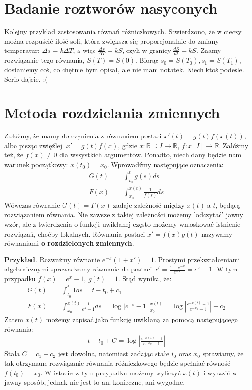 \section{Badanie roztworów nasyconych}
Kolejny przykład zastosowania równań różniczkowych. Stwierdzono, że w cieczy można rozpuścić ilość soli, która zwiększa się proporcjonalnie do zmiany temperatur: $\Delta s=k\Delta T$, a więc $\frac{\Delta s}{\Delta T}=kS$, czyli w granicy $\frac{dS}{dt}=kS$. Znamy rozwiązanie tego równania, $S\left( T \right) =S\left( 0 \right) $. Biorąc $s_0=S(T_0), s_1=S(T_1)$, dostaniemy coś, co chętnie bym opisał, ale nie mam notatek. Niech ktoś podeśle. Serio dajcie. :(

\section{Metoda rozdzielania zmiennych}
Załóżmy, że mamy do czynienia z równaniem postaci $x'(t) = g(t)f\left(x(t)\right)$, albo pisząc zwięźlej: $x' = g(t)f(x)$, gdzie $x : \mathbb{R} \supseteq I \to \mathbb{R}$, $f : x\left[I\right] \to \mathbb{R}$. Załóżmy też, że $f(x) \neq 0$ dla wszystkich argumentów. Ponadto, niech dany będzie nam warunek początkowy: $x(t_0) = x_0$. Wprowadźmy następujące oznaczenia:
\begin{align*}
	G(t) =& \int_{t_0}^{t} g(s) ds \\
	F(x) =& \int_{x_0}^{x(t)} \frac{1}{f(s)} ds
\end{align*}
Wówczas równanie $G(t) = F(x)$ zadaje zależność między $x(t)$ a $t$, będącą rozwiązaniem równania. Nie zawsze z takiej zależności możemy 'odczytać' jawny wzór, ale z twierdzenia o funkcji uwikłanej często możemy wnioskować istnienie rozwiązań, choćby lokalnych. Równania postaci $x' = f(x)g(t)$ nazywamy równaniami \textbf{o rozdzielonych zmiennych}. 

\textbf{Przykład}. Rozważmy równanie $e^{-x}(1+x')=1$. Prostymi przekształceniami algebraicznymi sprowadzamy równanie do postaci $x' = \frac{1-e^{-x}}{e^{-x}} = e^x-1$. W tym przypadku $f(x) = e^x-1$, $g(t) = 1$. Stąd wynika, że:
\begin{align*}
	G(t) =& \int_{t_0}^{t} 1 ds = t-t_0+c_1 \\
	F(x) =& \int_{x_0}^{x(t)} \frac{1}{e^s-1} ds = \log|e^{-s}-1|\bigg|_{x_0}^{x(t)} = \log \left| \frac{e^{-x(t)}-1}{e^{-x_0}-1}\right| +c_2
\end{align*}
Zatem $x(t)$ możemy zapisać jako funkcję uwikłaną za pomocą następującego równania:
\begin{align*}
	t-t_0 + C = \log\left|\frac{e^{-x(t)}-1}{e^{-x_0}-1}\right|
\end{align*}
Stała $C = c_1-c_2$ jest dowolna, natomiast zadając stałe $t_0$ oraz $x_0$ sprawiamy, że tak otrzymane rozwiązanie równania różniczkowego będzie spełniać równość $f(t_0) = x_0$. W istocie w tym przypadku możemy wyliczyć $x(t)$ i wyrazić w jawny sposób, jednak nie jest to ani konieczne, ani wygodne.
